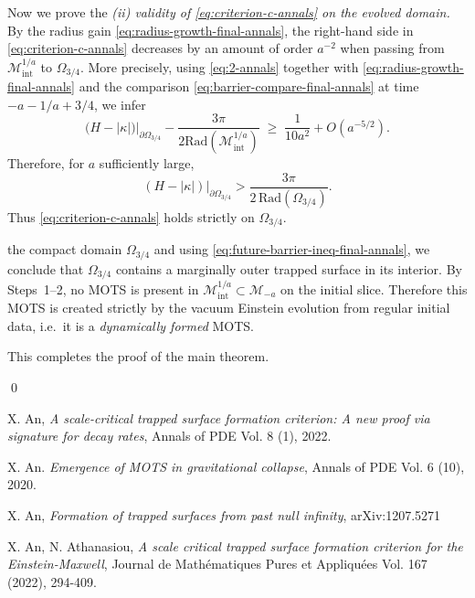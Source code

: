 \documentclass{amsart}
\begin{document}
{\smallskip

\noindent Now we prove the \emph{(ii) validity of \eqref{eq:criterion-c-annals} on the evolved domain.}
By the radius gain \eqref{eq:radius-growth-final-annals}, the right-hand side in \eqref{eq:criterion-c-annals} decreases by an amount of order $a^{-2}$ when passing from $\mathcal M^{1/a}_{\mathrm{int}}$ to $\Omega_{3/4}$. More precisely, using \eqref{eq:2-annals} together with \eqref{eq:radius-growth-final-annals} and the comparison \eqref{eq:barrier-compare-final-annals} at time $-a-1/a+3/4$, we infer
\[
\big(H-|\kappa|\big)\big|_{\partial \Omega_{3/4}}-\frac{3\pi}{2\text{Rad}(\mathcal M^{1/a}_{\mathrm{int}})}
\;\ge\;
\frac{1}{10 a^{2}}+O(a^{-5/2}).
\]
Therefore, for $a$ sufficiently large,
\begin{equation}\label{eq:future-barrier-ineq-final-annals}
(H-|\kappa|)\big|_{\partial \Omega_{3/4}}
>
\frac{3\pi}{2\,\text{Rad}(\Omega_{3/4})}.
\end{equation}
Thus \eqref{eq:criterion-c-annals} holds strictly on $\Omega_{3/4}$.

\smallskip

\noindent
 the compact domain $\Omega_{3/4}$ and using \eqref{eq:future-barrier-ineq-final-annals}, we conclude that $\Omega_{3/4}$ contains a marginally outer trapped surface in its interior. By Steps~1--2, no MOTS is present in $\mathcal M^{1/a}_{\mathrm{int}}\subset \mathcal M_{-a}$ on the initial slice. Therefore this MOTS is created strictly by the vacuum Einstein evolution from regular initial data, i.e.\ it is a \emph{dynamically formed} MOTS.

\medskip

\noindent
This completes the proof of the main theorem.

\qed


\begin{thebibliography}{}
X. An, \textit{A scale-critical trapped surface formation criterion: A new proof via signature for decay rates}, Annals of PDE {Vol. 8} (1), 2022.

  X. An. \textit{Emergence of MOTS in gravitational collapse}, Annals of PDE Vol. 6 (10), 2020.

 X. An, \textit{Formation of trapped surfaces from past null infinity}, arXiv:1207.5271 

 X. An, N. Athanasiou, \textit{A scale critical trapped surface formation criterion for the Einstein-Maxwell}, Journal de Mathématiques Pures et Appliquées Vol. 167 (2022), 294-409.



\end{thebibliography}}
\end{document}
